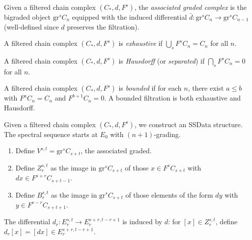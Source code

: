 \begin{definition}\label{prereq:def:associated-graded-complex}
    \leanok
    Given a filtered chain complex $(C_*, d, F^s)$, the \emph{associated graded complex} is the bigraded object $\mathrm{gr}^s C_n$ equipped with the induced differential $\bar{d}: \mathrm{gr}^s C_n \to \mathrm{gr}^s C_{n-1}$ (well-defined since $d$ preserves the filtration).
\end{definition}

\begin{definition}\label{prereq:def:exhaustive}
    \leanok
    A filtered chain complex $(C_*, d, F^s)$ is \emph{exhaustive} if $\bigcup_s F^s C_n = C_n$ for all $n$.
\end{definition}

\begin{definition}\label{prereq:def:hausdorff}
    \leanok
    A filtered chain complex $(C_*, d, F^s)$ is \emph{Hausdorff} (or \emph{separated}) if $\bigcap_s F^s C_n = 0$ for all $n$.
\end{definition}

\begin{definition}\label{prereq:def:bounded-filtration}
    \leanok
    A filtered chain complex $(C_*, d, F^s)$ is \emph{bounded} if for each $n$, there exist $a \le b$ with $F^a C_n = C_n$ and $F^{b+1} C_n = 0$. A bounded filtration is both exhaustive and Hausdorff.
\end{definition}

\begin{definition}\label{prereq:def:filtered-complex-ssdata}
    \leanok
    Given a filtered chain complex $(C_*, d, F^s)$, we construct an SSData structure. The spectral sequence starts at $E_0$ with $(n+1)$-grading.
    \begin{enumerate}
        \item Define $V^{s,t} = \mathrm{gr}^s C_{s+t}$, the associated graded.
        \item Define $Z_r^{s,t}$ as the image in $\mathrm{gr}^s C_{s+t}$ of those $x \in F^s C_{s+t}$ with $dx \in F^{s+r} C_{s+t-1}$.
        \item Define $B_r^{s,t}$ as the image in $\mathrm{gr}^s C_{s+t}$ of those elements of the form $dy$ with $y \in F^{s-r} C_{s+t+1}$.
    \end{enumerate}
    The differential $d_r: E_r^{s,t} \to E_r^{s+r,t-r+1}$ is induced by $d$: for $[x] \in Z_r^{s,t}$, define $d_r[x] = [dx] \in E_r^{s+r,t-r+1}$.
\end{definition}

